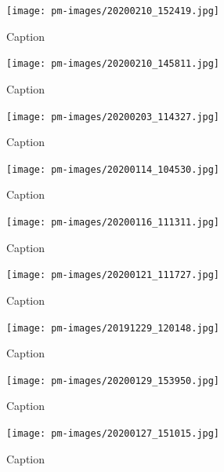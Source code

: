         \clearpage
        
\begin{figure}[]
\centering
\texttt{[image: pm-images/20200210\_152419.jpg]}
\caption{Caption}
\end{figure}

        \clearpage
        
\begin{figure}[]
\centering
\texttt{[image: pm-images/20200210\_145811.jpg]}
\caption{Caption}
\end{figure}

        \clearpage
        
\begin{figure}[]
\centering
\texttt{[image: pm-images/20200203\_114327.jpg]}
\caption{Caption}
\end{figure}

        \clearpage
        
\begin{figure}[]
\centering
\texttt{[image: pm-images/20200114\_104530.jpg]}
\caption{Caption}
\end{figure}

        \clearpage
        
\begin{figure}[]
\centering
\texttt{[image: pm-images/20200116\_111311.jpg]}
\caption{Caption}
\end{figure}

        \clearpage
        
\begin{figure}[]
\centering
\texttt{[image: pm-images/20200121\_111727.jpg]}
\caption{Caption}
\end{figure}

        \clearpage
        
\begin{figure}[]
\centering
\texttt{[image: pm-images/20191229\_120148.jpg]}
\caption{Caption}
\end{figure}

        \clearpage
        
\begin{figure}[]
\centering
\texttt{[image: pm-images/20200129\_153950.jpg]}
\caption{Caption}
\end{figure}

\begin{figure}[]
\centering
\texttt{[image: pm-images/20200127\_151015.jpg]}
\caption{Caption}
\end{figure}

